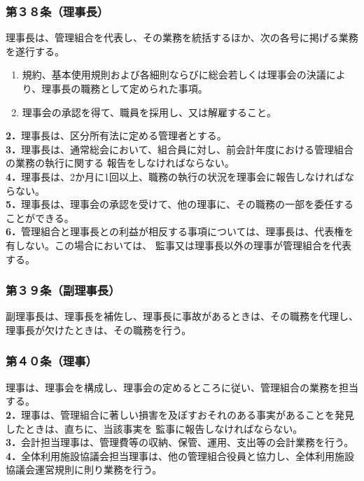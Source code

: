 \documentclass[
  luatex,
  paper=a4paper,
  fontsize=11pt,
  jafontsize=11pt,
  jlreq_notes,
]{jlreq}
\begin{document}
  \subsubsection*{第３８条（理事長）}
  理事長は、管理組合を代表し、その業務を統括するほか、次の各号に掲げる業務を遂行する。
  \begin{enumerate}
  \item 規約、基本使用規則および各細則ならびに総会若しくは理事会の決議により、理事長の職務として定められた事項。
  \item 理事会の承認を得て、職員を採用し、又は解雇すること。
  \end{enumerate}
  \textbf{2．}理事長は、区分所有法に定める管理者とする。\\
  \textbf{3．}理事長は、通常総会において、組合員に対し、前会計年度における管理組合の業務の執行に関する
  報告をしなければならない。\\
  \textbf{4．}理事長は、2か月に1回以上、職務の執行の状況を理事会に報告しなければならない。\\
  \textbf{5．}理事長は、理事会の承認を受けて、他の理事に、その職務の一部を委任することができる。\\
  \textbf{6．}管理組合と理事長との利益が相反する事項については、理事長は、代表権を有しない。この場合においては、
  監事又は理事長以外の理事が管理組合を代表する。
  \subsubsection*{第３９条（副理事長）}
  副理事長は、理事長を補佐し、理事長に事故があるときは、その職務を代理し、理事長が欠けたときは、その職務を行う。
  \subsubsection*{第４０条（理事）}
  理事は、理事会を構成し、理事会の定めるところに従い、管理組合の業務を担当する。\\
  \textbf{2．}理事は、管理組合に著しい損害を及ぼすおそれのある事実があることを発見したときは、直ちに、当該事実を
  監事に報告しなければならない。\\
  \textbf{3．}会計担当理事は、管理費等の収納、保管、運用、支出等の会計業務を行う。\\
  \textbf{4．}全体利用施設協議会担当理事は、他の管理組合役員と協力し、全体利用施設協議会運営規則に則り業務を行う。
\end{document}
